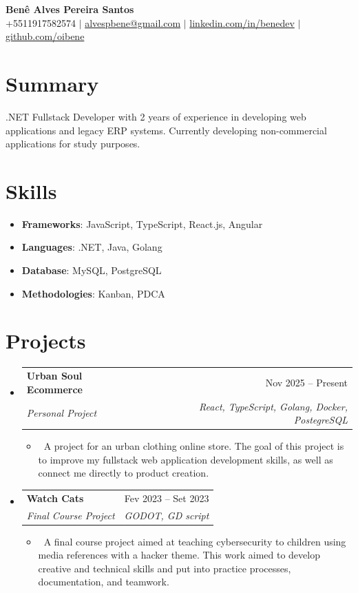 \documentclass[letterpaper,10pt]{article}
\makeatletter
\newcommand{\resumeItem}[1]{\item\small{#1}}
\newcommand{\resumeSubheading}[4]{
\vspace{-1pt}\item
  \begin{tabular*}{0.97\textwidth}[t]{l@{\extracolsep{\fill}}r}
    \textbf{#1} & #2 \\
    \textit{#3} & \textit{#4} \\
  \end{tabular*}\vspace{-7pt}
}
\newcommand{\resumeSubHeadingList}{\begin{itemize}[leftmargin=0.15in, label={}]}
\newcommand{\resumeSubHeadingListEnd}{\end{itemize}}
\makeatother
\begin{document}
\begin{center}
  \textbf{\Huge Benê Alves Pereira Santos} \\
  \small +5511917582574 $|$ \href{mailto:alvespbene@gmail.com}{alvespbene@gmail.com} $|$ 
  \href{https://linkedin.com/in/benedev}{linkedin.com/in/benedev} $|$
  \href{https://github.com/oibene}{github.com/oibene}
\end{center}

\section*{Summary}
.NET Fullstack Developer with 2 years of experience in developing web applications and legacy ERP systems. Currently developing non-commercial applications for study purposes.

\section{Skills}
\resumeSubHeadingList
  \resumeItem{\textbf{Frameworks}: JavaScript, TypeScript, React.js, Angular}
  \resumeItem{\textbf{Languages}: .NET, Java, Golang}
  \resumeItem{\textbf{Database}: MySQL, PostgreSQL}
  \resumeItem{\textbf{Methodologies}: Kanban, PDCA}
\resumeSubHeadingListEnd

\section{Projects}
\resumeSubHeadingList
  \resumeSubheading
      {Urban Soul Ecommerce}{Nov 2025 -- Present}
      {Personal Project}{React, TypeScript, Golang, Docker, PostegreSQL}
      \resumeSubHeadingList
          \resumeItem{\textbf\ A project for an urban clothing online store. The goal of this project is to improve my fullstack web application development skills, as well as connect me directly to product creation.}
      \resumeSubHeadingListEnd
  \resumeSubheading
      {Watch Cats}{Fev 2023 -- Set 2023} 
      {Final Course Project}{GODOT, GD script}
      \resumeSubHeadingList
          \resumeItem{\textbf\ A final course project aimed at teaching cybersecurity to children using media references with a hacker theme. This work aimed to develop creative and technical skills and put into practice processes, documentation, and teamwork.}
      \resumeSubHeadingListEnd
\resumeSubHeadingListEnd
\end{document}
